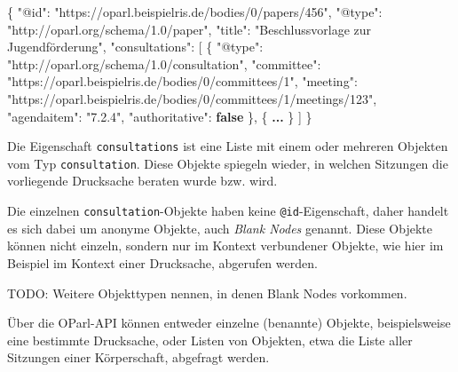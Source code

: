 \documentclass[,a4paper]{article}
\newenvironment{Shaded}{}{}
\newcommand{\KeywordTok}[1]{\textcolor[rgb]{0.00,0.44,0.13}{\textbf{{#1}}}}
\newcommand{\DataTypeTok}[1]{\textcolor[rgb]{0.56,0.13,0.00}{{#1}}}
\newcommand{\StringTok}[1]{\textcolor[rgb]{0.25,0.44,0.63}{{#1}}}
\newcommand{\OtherTok}[1]{\textcolor[rgb]{0.00,0.44,0.13}{{#1}}}
\newcommand{\FunctionTok}[1]{\textcolor[rgb]{0.02,0.16,0.49}{{#1}}}
\newcommand{\ErrorTok}[1]{\textcolor[rgb]{1.00,0.00,0.00}{\textbf{{#1}}}}
\begin{document}
\begin{Shaded}
\begin{Highlighting}[]
\FunctionTok{\{}
    \DataTypeTok{"@id"}\FunctionTok{:} \StringTok{"https://oparl.beispielris.de/bodies/0/papers/456"}\FunctionTok{,}
    \DataTypeTok{"@type"}\FunctionTok{:} \StringTok{"http://oparl.org/schema/1.0/paper"}\FunctionTok{,}
    \DataTypeTok{"title"}\FunctionTok{:} \StringTok{"Beschlussvorlage zur Jugendförderung"}\FunctionTok{,}
    \DataTypeTok{"consultations"}\FunctionTok{:} \OtherTok{[}
        \FunctionTok{\{}
            \DataTypeTok{"@type"}\FunctionTok{:} \StringTok{"http://oparl.org/schema/1.0/consultation"}\FunctionTok{,}
            \DataTypeTok{"committee"}\FunctionTok{:} \StringTok{"https://oparl.beispielris.de/bodies/0/committees/1"}\FunctionTok{,}
            \DataTypeTok{"meeting"}\FunctionTok{:} \StringTok{"https://oparl.beispielris.de/bodies/0/committees/1/meetings/123"}\FunctionTok{,}
            \DataTypeTok{"agendaitem"}\FunctionTok{:} \StringTok{"7.2.4"}\FunctionTok{,}
            \DataTypeTok{"authoritative"}\FunctionTok{:} \KeywordTok{false}
        \FunctionTok{\}}\OtherTok{,}
        \FunctionTok{\{}
            \ErrorTok{...}
        \FunctionTok{\}}
    \OtherTok{]}
\FunctionTok{\}}
\end{Highlighting}
\end{Shaded}

Die Eigenschaft \texttt{consultations} ist eine Liste mit einem oder
mehreren Objekten vom Typ \texttt{consultation}. Diese Objekte spiegeln
wieder, in welchen Sitzungen die vorliegende Drucksache beraten wurde
bzw. wird.

Die einzelnen \texttt{consultation}-Objekte haben keine
\texttt{@id}-Eigenschaft, daher handelt es sich dabei um anonyme
Objekte, auch \emph{Blank Nodes} genannt. Diese Objekte können nicht
einzeln, sondern nur im Kontext verbundener Objekte, wie hier im
Beispiel im Kontext einer Drucksache, abgerufen werden.

TODO: Weitere Objekttypen nennen, in denen Blank Nodes vorkommen.


Über die OParl-API können entweder einzelne (benannte) Objekte,
beispielsweise eine bestimmte Drucksache, oder Listen von Objekten, etwa
die Liste aller Sitzungen einer Körperschaft, abgefragt werden.
\end{document}
